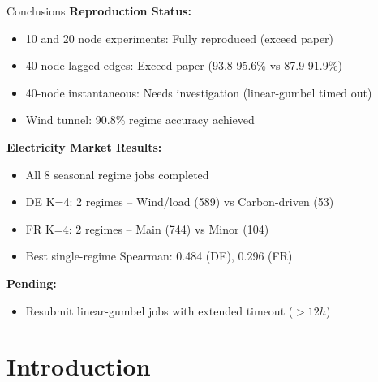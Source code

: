 \documentclass[aspectratio=169]{beamer}
\begin{document}
\begin{frame}{Conclusions}
\textbf{Reproduction Status:}
\begin{itemize}
    \item \textcolor{reprogreen}{10 and 20 node experiments: Fully reproduced (exceed paper)}
    \item \textcolor{reprogreen}{40-node lagged edges: Exceed paper (93.8-95.6\% vs 87.9-91.9\%)}
    \item \textcolor{warnred}{40-node instantaneous: Needs investigation (linear-gumbel timed out)}
    \item \textcolor{reprogreen}{Wind tunnel: 90.8\% regime accuracy achieved}
\end{itemize}

\textbf{Electricity Market Results:}
\begin{itemize}
    \item \textcolor{reprogreen}{All 8 seasonal regime jobs completed}
    \item \textcolor{reprogreen}{DE K=4: 2 regimes} -- Wind/load (589) vs Carbon-driven (53)
    \item \textcolor{reprogreen}{FR K=4: 2 regimes} -- Main (744) vs Minor (104)
    \item Best single-regime Spearman: 0.484 (DE), 0.296 (FR)
\end{itemize}

\textbf{Pending:}
\begin{itemize}
    \item Resubmit linear-gumbel jobs with extended timeout ($>12h$)
\end{itemize}
\end{frame}
\section{Introduction}
\end{document}
